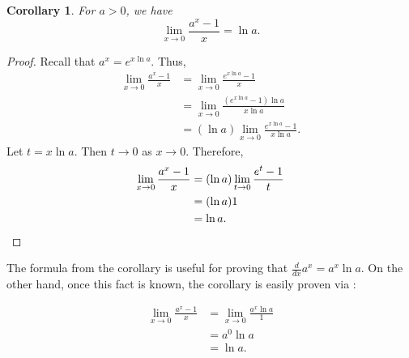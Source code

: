 \documentclass[12pt]{article}
\newtheorem*{cor*}{Corollary}
\begin{document}
\begin{cor*}
For $a>0$, we have
\[
\lim_{x\to 0}\frac{a^x-1}{x}=\ln a.
\]
\end{cor*}

\begin{proof}
Recall that $a^x=e^{x\ln a}$.  Thus,
\begin{align*}
\lim_{x\to 0}\frac{a^x-1}{x} & =\lim_{x\to 0}\frac{e^{x\ln a}-1}{x} \\
                             & =\lim_{x\to 0}\frac{(e^{x\ln a}-1)\ln a}{x\ln a} \\
                             & =(\ln a)\lim_{x\to 0}\frac{e^{x\ln a}-1}{x\ln a}.
\end{align*}
Let $t=x\ln a$.  Then $t\to 0$ as $x\to 0$.  Therefore,
\begin{align*}
\lim_{x\to 0}\frac{a^x-1}{x} & =(\ln a)\lim_{t\to 0}\frac{e^t-1}{t} \\
                             & =(\ln a)1 \\
                             & =\ln a.  \qedhere
\end{align*}
\end{proof}

The formula from the corollary is useful for proving that $\displaystyle \frac{d}{dx}a^x=a^x\ln a$.  On the other hand, once this fact is known, the corollary is easily proven via :

\begin{align*}
\lim_{x\to 0}\frac{a^x-1}{x} & =\lim_{x\to 0}\frac{a^x\ln a}{1} \\
                             & =a^0\ln a \\
                             & =\ln a.
\end{align*}
\end{document}
